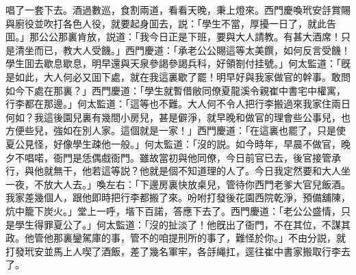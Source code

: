 唱了一套下去。酒過數巡，食割兩道，看看天晚，秉上燈來。西門慶喚玳安㧱賞賜與廚役並吹打各色人役，就要起身囬去，説：「學生不當，厚擾一日了，就此告囬。」那公公那裏肯放，説道：「我今日正是下班，要與大人請教。有甚大酒席！只是清坐而已，教大人受饑。」西門慶道：「承老公公賜這等太美饌，如何反言受饑！學生囬去歇息歇息，明早還與天泉參謁參謁兵科，好領劄付挂號。」何太監道：「旣是如此，大人何必又囬下處，就在我這裏歇了罷！明早好與我家做官的幹事。敢問如今下處在那裏？」西門慶道：「學生就暫借敝同僚夏龍溪令親崔中書宅中權寓，行李都在那邊。」何太監道：「這等也不難。大人何不令人把行李搬過來我家住兩日何如？我這後園兒裏有幾間小房兒，甚是僻淨，就早晚和做官的理會些公事兒，也方便些兒，強如在別人家。這個就是一家！」西門慶道：「在這裏也罷了，只是使夏公見怪，好像學生疎他一般。」何太監道：「沒的説。如今時年，早晨不做官，晚夕不唱喏，衙門是恁偶戲衙門。雖故當初與他同僚，今日前官已去，後官接管承行，與他就無干，他若這等説？他就是個不知道理的人了。今日我定然要和大人坐一夜，不放大人去。」喚左右：「下邊房裏快放桌兒，管待你西門老爹大官兒飯酒。我家差幾個人，跟他即時把行李都搬了來。吩咐打發後花園西院乾淨，預備舖陳，炕中籠下炭火。」堂上一呼，堦下百諾，答應下去了。西門慶道：「老公公盛情，只是學生得罪夏公了。」何太監道：「沒的扯淡了！他旣出了衙門，不在其位，不謀其政。他管他那裏鑾駕庫的事，管不的咱提刑所的事了，難怪於你。」不由分説，就打發玳安並馬上人喫了酒飯，差了幾名軍牢，各㧱䋲扛，逕往崔中書家搬取行李去了。

